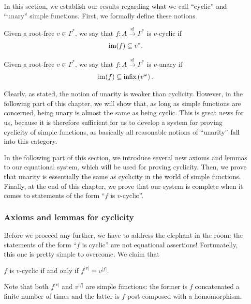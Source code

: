In this section, we establish our results regarding what we call ``cyclic'' and ``unary'' simple functions. First, we formally define these notions.

\begin{definition}
    Given a root-free $v \in \Gamma^*$, we say that $f : A \xrightarrow{\mathrm{sf}} \Gamma^*$ is $v$-cyclic if
    \[
        \operatorname{\mathrm{im}} (f) \subseteq v^*.
    \]
\end{definition}

\begin{definition}
    Given a root-free $v \in \Gamma^*$, we say that $f : A \xrightarrow{\mathrm{sf}} \Gamma^*$ is $v$-unary if
    \[
        \operatorname{\mathrm{im}} (f) \subseteq \mathrm{infix} \left( v^\omega \right).
    \]
\end{definition}

Clearly, as stated, the notion of unarity is weaker than cyclicity. However, in the following part of this chapter, we will show that, as long as simple functions are concerned, being unary is almost the same as being cyclic. This is great news for us, because it is therefore sufficient for us to develop a system for proving cyclicity of simple functions, as basically all reasonable notions of ``unarity'' fall into this category. 

In the following part of this section, we introduce several new axioms and lemmas to our equational system, which will be used for proving cyclicity. Then, we prove that unarity is essentially the same as cyclicity in the world of simple functions. Finally, at the end of this chapter, we prove that our system is complete when it comes to statements of the form ``$f$ is $v$-cyclic''.

\subsubsection{Axioms and lemmas for cyclicity}

Before we proceed any further, we have to address the elephant in the room: the statements of the form ``$f$ is cyclic'' are not equational assertions! Fortunatelly, this one is pretty simple to overcome. We claim that

\begin{center}
    $f$ is $v$-cyclic \quad if and only if \quad $f^{|v|} = v^{|f|}$. 
\end{center}

Note that both $f^{|v|}$ and $v^{|f|}$ are simple functions: the former is $f$ concatenated a finite number of times and the latter is $f$ post-composed with a homomorphism.


